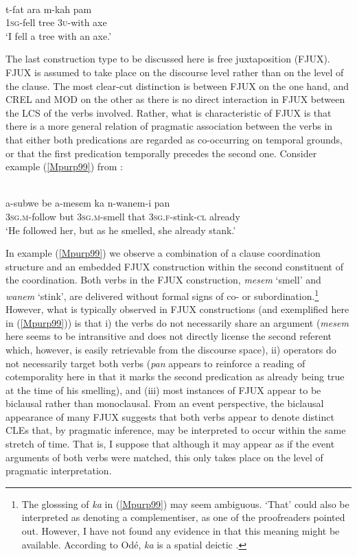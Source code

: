 \ea 
{}\\
\gll t-fat ara m-kah pam \\
1\textsc{sg}-fell tree 3\textsc{u}-with axe \\
\glft `I fell a tree with an axe.'\\ 
\z

The last construction type to be discussed here is free juxtaposition (FJUX). FJUX is assumed to take place on the discourse level rather than on the level of the clause. The most clear-cut distinction is between FJUX on the one hand, and CREL and MOD on the other as there is no direct interaction in FJUX between the LCS of the verbs involved. Rather, what is characteristic of FJUX is that there is a more general relation of pragmatic association between the verbs in that either both predications are regarded as co-occurring on temporal grounds, or that the first predication temporally precedes the second one. Consider example (\ref{Mpurp99}) from :

\ea \label{Mpurp99}
\\
\gll a-subwe be a-mesem ka n-wanem-i pan \\
\textsc{3}\textsc{sg}.\textsc{m}-follow but \textsc{3}\textsc{sg}.\textsc{m}-smell that \textsc{3}\textsc{sg}.\textsc{f}-stink-\textsc{cl} already \\
\glft `He followed her, but as he smelled, she already stank.' \\ 
\z

In example (\ref{Mpurp99}) we observe a combination of a clause coordination structure and an embedded FJUX construction within the second constituent of the coordination. Both verbs in the FJUX construction, \textit{mesem} `smell' and \textit{wanem} `stink', are delivered without formal signs of co- or subordination.\footnote{The glosssing of \textit{ka} in (\ref{Mpurp99}) may seem ambiguous. `That' could also be interpreted as denoting a complementiser, as one of the proofreaders pointed out. However, I have not found any evidence in \citet{ode2002sketch} that this meaning might be available. According to Odé, \textit{ka} is a spatial deictic \citep[64]{ode2002sketch}.} However, what is typically observed in FJUX constructions (and exemplified here in (\ref{Mpurp99})) is that i) the verbs do not necessarily share an argument (\textit{mesem} here seems to be intransitive and does not directly license the second referent which, however, is easily retrievable from the discourse space), ii) operators do not necessarily target both verbs (\textit{pan} appears to reinforce a reading of cotemporality here in that it marks the second predication as already being true at the time of his smelling), and (iii) most instances of FJUX appear to be biclausal rather than monoclausal. From an event perspective, the biclausal appearance of many FJUX suggests that both verbs appear to denote distinct CLEs that, by pragmatic inference, may be interpreted to occur within the same stretch of time. That is, I suppose that although it may appear as if the event arguments of both verbs were matched, this only takes place on the level of pragmatic interpretation.

